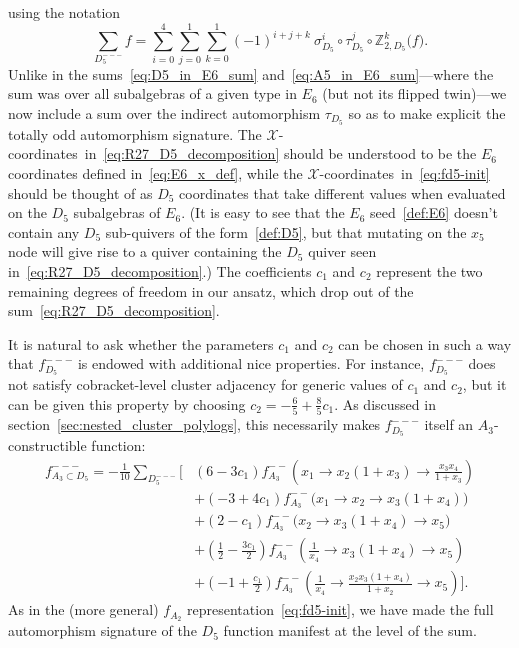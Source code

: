\documentclass[12pt]{article}
\def\nl{\nonumber\\}
\def\xcoords{$\mathcal{X}$-coordinates}
\begin{document}
using the notation
\begin{equation}
	\sum_{D_5^{---}} f = \sum_{i=0}^4\sum_{j=0}^1\sum_{k=0}^1 (-1)^{i+j+k}\  \sigma_{D_5}^i \circ \tau_{D_5}^j \circ \mathbb{Z}_{2,D_5}^k \big(f\big).
\end{equation}
Unlike in the sums~\eqref{eq:D5_in_E6_sum} and~\eqref{eq:A5_in_E6_sum}---where the sum was over all subalgebras of a given type in $E_6$ (but not its flipped twin)---we now include a sum over the indirect automorphism $\tau_{D_5}$ so as to make explicit the totally odd automorphism signature. The \xcoords\ in~\eqref{eq:R27_D5_decomposition} should be understood to be the $E_6$ coordinates defined in~\eqref{eq:E6_x_def}, while the \xcoords\ in~\eqref{eq:fd5-init} should be thought of as $D_5$ coordinates that take different values when evaluated on the $D_5$ subalgebras of $E_6$. (It is easy to see that the $E_6$ seed~\eqref{def:E6} doesn't contain any $D_5$ sub-quivers of the form~\eqref{def:D5}, but that mutating on the $x_5$ node will give rise to a quiver containing the $D_5$ quiver seen in~\eqref{eq:R27_D5_decomposition}.) The coefficients $c_1$ and $c_2$ represent the two remaining degrees of freedom in our ansatz, which drop out of the sum~\eqref{eq:R27_D5_decomposition}.

It is natural to ask whether the parameters $c_1$ and $c_2$ can be chosen in such a way that $f_{D_5}^{---}$ is endowed with additional nice properties. For instance, $f_{D_5}^{---}$ does not satisfy cobracket-level cluster adjacency for generic values of $c_1$ and $c_2$, but it can be given this property by choosing $c_2 = -\frac{6}{5} + \frac{8}{5} c_1$. As discussed in section~\ref{sec:nested_cluster_polylogs}, this necessarily makes $f_{D_5}^{---}$ itself an $A_3$-constructible function:
\begin{align}
	f_{A_3\subset D_5}^{---} = - \frac{1}{10}\sum_{D_5^{---}}\bigg[ 
	&\left(6-3 c_1\right) f_{A_3}^{--}\left(x_1\to x_2 \left(1+x_3\right)\to \frac{x_3 x_4}{1+x_3}\right)  \nonumber \\[-.34cm]
	&+ \left(-3+4 c_1\right) f_{A_3}^{--}\big(x_1\to x_2\to x_3 \left(1+x_4\right)\big)  \nl
	&+ \left(2-c_1\right) f_{A_3}^{--}\big(x_2\to x_3 \left(1+x_4\right)\to x_5\big) \\
	&+ \left(\frac{1}{2}-\frac{3 c_1}{2}\right) f_{A_3}^{--}\left(\frac{1}{x_4}\to x_3 \left(1+x_4\right)\to x_5\right)  \nl
	&+ \left(-1+\frac{c_1}{2}\right) f_{A_3}^{--}\left(\frac{1}{x_4}\to \frac{x_2 x_3 \left(1+x_4\right)}{1+x_2}\to x_5\right) \bigg]. \nonumber
\end{align}
As in the (more general) $f_{A_2}$ representation~\eqref{eq:fd5-init}, we have made the full automorphism signature of the $D_5$ function manifest at the level of the sum. 
\end{document}
